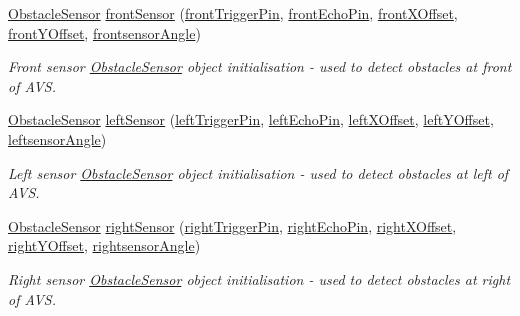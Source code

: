 \begin{DoxyCompactItemize}
\mbox{\hyperlink{class_obstacle_sensor}{Obstacle\+Sensor}} \mbox{\hyperlink{bot_main_8ino_a355879266d10af4a6e9126a47bc09113}{front\+Sensor}} (\mbox{\hyperlink{bot_main_8ino_ae091a21fa97656ee7bd8c5f79c45b752}{front\+Trigger\+Pin}}, \mbox{\hyperlink{bot_main_8ino_a0b14c45d0e2dfeef70f98b914ca277f5}{front\+Echo\+Pin}}, \mbox{\hyperlink{bot_main_8ino_abdd898a2dfa2f64e2821af36c6ed3724}{front\+X\+Offset}}, \mbox{\hyperlink{bot_main_8ino_a4919465d0182f44aa7acaa39ece1e17a}{front\+Y\+Offset}}, \mbox{\hyperlink{bot_main_8ino_ad681cfe410d5d764c513368773b9de93}{frontsensor\+Angle}})
\begin{DoxyCompactList}\small\item\em Front sensor \mbox{\hyperlink{class_obstacle_sensor}{Obstacle\+Sensor}} object initialisation -\/ used to detect obstacles at front of A\+VS. \end{DoxyCompactList}\item 
\mbox{\hyperlink{class_obstacle_sensor}{Obstacle\+Sensor}} \mbox{\hyperlink{bot_main_8ino_af137d1119f05ab98ae8e50559b9d6bfe}{left\+Sensor}} (\mbox{\hyperlink{bot_main_8ino_abf577279d52f4a773937cb36cc199c0b}{left\+Trigger\+Pin}}, \mbox{\hyperlink{bot_main_8ino_ad1b4a0b41d14f603ba696fad472c50d9}{left\+Echo\+Pin}}, \mbox{\hyperlink{bot_main_8ino_a2d121af61e2977de12f5bfbbe8559dca}{left\+X\+Offset}}, \mbox{\hyperlink{bot_main_8ino_a7be9826e4f54e376321bcdea4177a8ed}{left\+Y\+Offset}}, \mbox{\hyperlink{bot_main_8ino_a8be5324bad65fa0bad41e0c70066a958}{leftsensor\+Angle}})
\begin{DoxyCompactList}\small\item\em Left sensor \mbox{\hyperlink{class_obstacle_sensor}{Obstacle\+Sensor}} object initialisation -\/ used to detect obstacles at left of A\+VS. \end{DoxyCompactList}\item 
\mbox{\hyperlink{class_obstacle_sensor}{Obstacle\+Sensor}} \mbox{\hyperlink{bot_main_8ino_a4b08258caa24173f4153413d596aea69}{right\+Sensor}} (\mbox{\hyperlink{bot_main_8ino_ad7785c889e9d6290073148f74ce9de5e}{right\+Trigger\+Pin}}, \mbox{\hyperlink{bot_main_8ino_a922d02edb9759eb944c27cebb4a448cb}{right\+Echo\+Pin}}, \mbox{\hyperlink{bot_main_8ino_ac932cddb5bc68094c96d0034c92faef9}{right\+X\+Offset}}, \mbox{\hyperlink{bot_main_8ino_a07903b96b48e8e456debd9cc43c7af05}{right\+Y\+Offset}}, \mbox{\hyperlink{bot_main_8ino_a83724535498f068d5b44150a2bc4fcf8}{rightsensor\+Angle}})
\begin{DoxyCompactList}\small\item\em Right sensor \mbox{\hyperlink{class_obstacle_sensor}{Obstacle\+Sensor}} object initialisation -\/ used to detect obstacles at right of A\+VS. \end{DoxyCompactList}\item 

\end{DoxyCompactItemize}
